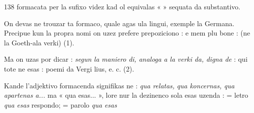 \begin{VUpage}[142]{138}
\VUcontinue
formacata per la sufixo  videz kad ol equivalas «  »\nl
sequata da substantivo.

On devas ne trouzar ta formaco, quale agas ula lingui,\nl
exemple la Germana. Precipue kun la propra nomi on uzez\nl
prefere prepoziciono :  e mem plu bone :\nl
{} (ne la Goeth-ala verki) (1).

Ma on uzas  por dicar : \textit{segun la maniero di, analoga}\nl
\textit{a la verki da, digna de} : \nl
{} qui tote ne esas : poemi da Vergi\cc
lius, e. c. (2).

Kande l'adjektivo formacenda signifikas ne : \textit{qua relatas,}\nl
\textit{qua koncernas, qua apartenas a...} ma « qua esas... », lore\nl
nur la dezinenco  sola esas uzenda :  =\nl
letro \textit{qua esas} respondo;  = parolo \textit{qua esas}\parplein
\end{VUpage}

